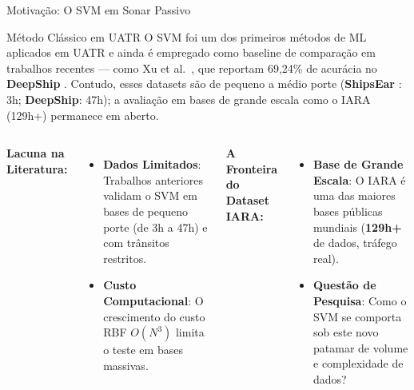 \documentclass{beamer}
\begin{document}
\begin{frame}{Motivação: O SVM em Sonar Passivo}
    \small
    \begin{block}{Método Clássico em UATR}
        O SVM foi um dos primeiros métodos de ML aplicados em UATR \cite{chen2023survey} e ainda é empregado como baseline de comparação em trabalhos recentes — como Xu et al.\ \cite{xu2023}, que reportam 69,24\% de acurácia no \textbf{DeepShip} \cite{deepship} . Contudo, esses datasets são de pequeno a médio porte (\textbf{ShipsEar} \cite{shipsear}: 3h; \textbf{DeepShip}: 47h); a avaliação em bases de grande escala como o IARA (129h+) permanece em aberto.
    \end{block}
    
    \vspace{0.1cm}
    
    \begin{columns}
        \footnotesize
        \textbf{Lacuna na Literatura:}
        \begin{itemize}
            \item \textbf{Dados Limitados}: Trabalhos anteriores validam o SVM em bases de pequeno porte (de 3h a 47h) e com trânsitos restritos.
            \item \textbf{Custo Computacional}: O crescimento do custo RBF $O(N^3)$ limita o teste em bases massivas.
        \end{itemize}
        
        \footnotesize
        \textbf{A Fronteira do Dataset IARA:}
        \begin{itemize}
            \item \textbf{Base de Grande Escala}: O IARA é uma das maiores bases públicas mundiais (\textbf{129h+} de dados, tráfego real).
            \item \textbf{Questão de Pesquisa}: Como o SVM se comporta sob este novo patamar de volume e complexidade de dados?
        \end{itemize}
    \end{columns}
\end{frame}
\end{document}
